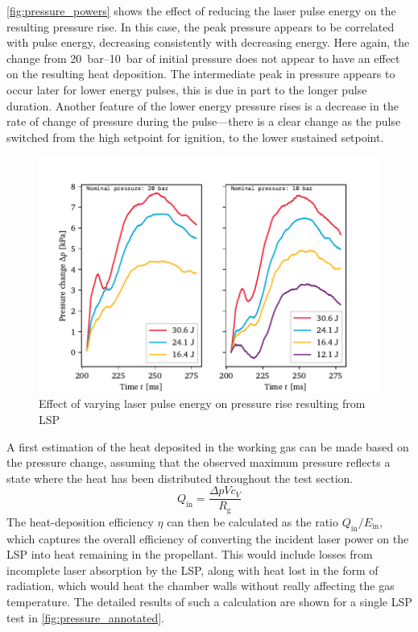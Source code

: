             \autoref{fig:pressure_powers} shows the effect of reducing the laser pulse energy on the resulting pressure rise. In this case, the peak pressure appears to be correlated with pulse energy, decreasing consistently with decreasing energy. Here again, the change from \qtyrange{20}{10}{bar} of initial pressure does not appear to have an effect on the resulting heat deposition. The intermediate peak in pressure appears to occur later for lower energy pulses, this is due in part to the longer pulse duration. Another feature of the lower energy pressure rises is a decrease in the rate of change of pressure during the pulse---there is a clear change as the pulse switched from the high setpoint for ignition, to the lower sustained setpoint.

            \begin{figure}[h]
                \centering
                \includegraphics[]{assets/5 results/pressure_powers}
                \caption{Effect of varying laser pulse energy on pressure rise resulting from LSP}
                \label{fig:pressure_powers}
            \end{figure}

            A first estimation of the heat deposited in the working gas can be made based on the pressure change, assuming that the observed maximum pressure reflects a state where the heat has been distributed throughout the test section. 
            \begin{equation} \label{eq:heatdep}
                Q_\mathrm{in} = \frac{\Delta pVc_V}{R_\mathrm{g}}
            \end{equation}
            The heat-deposition efficiency $\eta$ can then be calculated as the ratio $Q_\mathrm{in}/E_\mathrm{in}$, which captures the overall efficiency of converting the incident laser power on the LSP into heat remaining in the propellant. This would include losses from incomplete laser absorption by the LSP, along with heat lost in the form of radiation, which would heat the chamber walls without really affecting the gas temperature. The detailed results of such a calculation are shown for a single LSP test in \autoref{fig:pressure_annotated}.

